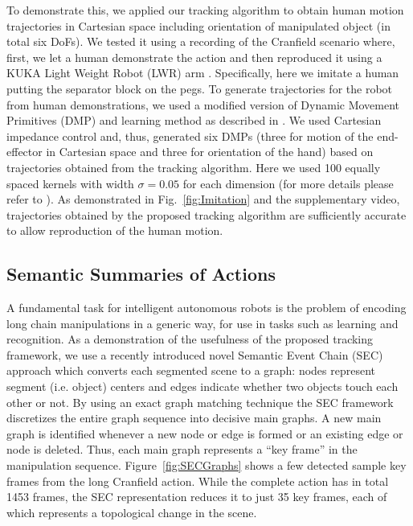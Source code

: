 To demonstrate this, we applied our tracking algorithm to obtain human motion trajectories in Cartesian space including orientation of manipulated object (in total six DoFs). We tested it using a recording of the Cranfield scenario where, first, we let a human demonstrate the action and then reproduced it using a KUKA Light Weight Robot (LWR) arm \cite{kuka}. Specifically, here we imitate a human putting the separator block on the pegs. To generate trajectories for the robot from human demonstrations, we used a modified version of Dynamic Movement Primitives \cite{Ijspeert2002,Ijspeert2013} (DMP) and learning method as described in \cite{Kulvicius2012}. We used Cartesian impedance control and, thus, generated six DMPs (three for motion of the end-effector in Cartesian space and three for orientation of the hand) based on trajectories obtained from the tracking algorithm. Here we used 100 equally spaced kernels with width $\sigma=0.05$ for each dimension (for more details please refer to \cite{Kulvicius2012}).
 As demonstrated in Fig.~\ref{fig:Imitation} and the supplementary video, trajectories obtained by the proposed tracking algorithm are sufficiently accurate to allow reproduction of the human motion.


\subsection{Semantic Summaries of Actions}
A fundamental task for intelligent autonomous robots is the problem of encoding long chain manipulations in a generic way, for use in tasks such as learning and recognition. As a demonstration of the usefulness of the proposed tracking framework, we use a recently introduced novel Semantic Event Chain (SEC) approach \cite{Aksoy11} which converts each segmented scene to a graph: nodes represent segment (i.e. object) centers and edges indicate whether two objects touch each other or not. By using an exact graph matching technique the SEC framework discretizes the entire graph sequence into decisive main graphs. A new main graph is identified whenever a new node or edge is formed or an existing edge or node is deleted. Thus, each main graph represents a “key frame” in the manipulation sequence. Figure~\ref{fig:SECGraphs} shows a few detected sample key frames from the long Cranfield action. While the complete action has in total 1453 frames, the SEC representation reduces it to just 35 key frames, each of which 
represents a topological change in the scene.


